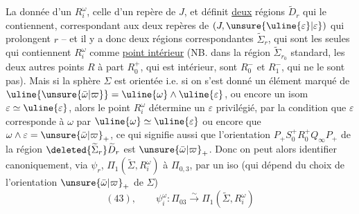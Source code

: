 La donnée d'un $R_i^\omega$,  celle d'un repère  de $J$, et définit \uline{deux}  régions $\widetilde D_r$ qui le contiennent, correspondant aux deux repères de $(J,\unsure{\uline{\varepsilon}|\varepsilon})$ qui prolongent $r$ -- et il y a donc deux régions correspondantes $\widetilde\Sigma_r$, qui sont les seules qui contiennent $R_i^\omega$ comme \uline{point intérieur} (NB. dans la région $\widetilde\Sigma_{r_0}$ standard, les deux autres points $R$ à part $R_0^+$, qui est intérieur, sont $R_0^-$ et $R_1^-$, qui ne le sont pas). Mais si la sphère $\Sigma$ est orientée i.e. si on s'est donné un élément marqué \inserted{$\unsure{\bar\omega|\varpi}_+$} de $\uline{\unsure{\bar\omega|\varpi}}=\uline{\omega}\wedge\uline{\varepsilon}$, ou encore un isom $\varepsilon\simeq\uline{\varepsilon}$, alors le point $R_i^\omega$ détermine un $\varepsilon$ \inserted{$\in\uline{\varepsilon}$} privilégié, par la condition que $\varepsilon$ corresponde à $\omega$ par $\uline{\omega}\simeq\uline{\varepsilon}$ ou encore que $\omega\wedge\varepsilon=\unsure{\bar\omega|\varpi}_+$, ce qui signifie aussi que l'orientation $P_+S_0^+R_0^+Q_\infty P_+$ de la région $\deleted{\widetilde\Sigma_r}\widetilde D_r$ est  $\unsure{\bar\omega|\varpi}_+$. Donc on peut alors identifier canoniquement, via $\psi_r$, $\Pi_1(\widetilde\Sigma,R_i^\omega)$ à $\Pi_{0,3}$, par un iso (qui dépend du choix de l'orientation $\unsure{\bar\omega|\varpi}_+$ de $\Sigma$)
\[
(43),\qquad\psi_i^\omega:\Pi_{03}\xrightarrow{\sim}\Pi_1(\widetilde\Sigma,R_i^\omega)
\]
